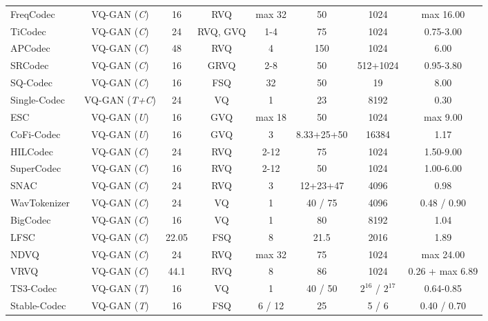 \begin{table*}[]
{\begin{tabular}{@{}lccccccc@{}}
{FreqCodec}~\cite{du2024funcodec} & VQ-GAN (\textit{C})& 16 & RVQ & max 32 & 50 & 1024 & max 16.00 \\
TiCodec~\cite{ticodec} & VQ-GAN (\textit{C})& 24 & RVQ, GVQ & 1-4 & 75 & 1024 & 0.75-3.00  \\
APCodec~\cite{APCodec} & VQ-GAN (\textit{C})& 48 & RVQ & 4 & 150 &1024 & 6.00 \\
SRCodec~\cite{zheng2024srcodec} & VQ-GAN (\textit{C}) & 16 & GRVQ   & 2-8 & 50 & 512+1024 & 0.95-3.80\\
SQ-Codec~\cite{yang24l_interspeech} & VQ-GAN (\textit{C})& 16 & FSQ & 32 & 50 &19 & 8.00 \\
Single-Codec~\cite{singlecodec} & VQ-GAN (\textit{T+C})& 24 & VQ & 1 & 23 & 8192 & 0.30  \\
ESC~\cite{gu2024esc}  & VQ-GAN (\textit{U})& 16 & GVQ & max 18 & 50 & 1024 & max 9.00 \\
CoFi-Codec~\cite{guo2024speaking} & VQ-GAN (\textit{U}) & 16 & GVQ & 3 & 8.33+25+50 & 16384 & 1.17 \\
HILCodec~\cite{ahn2024hilcodec} & VQ-GAN (\textit{C})& 24 & RVQ & 2-12 & 75 & 1024 & 1.50-9.00 \\
SuperCodec~\cite{zheng2024supercodec} & VQ-GAN (\textit{C})& 16 & RVQ & 2-12 & 50 & 1024 & 1.00-6.00\\
SNAC~\cite{Siuzdak_SNAC_Multi-Scale_Neural_2024} & VQ-GAN (\textit{C})& 24 & RVQ & 3 &12+23+47 & 4096 & 0.98 \\
WavTokenizer~\cite{ji2024wavtokenizer} & VQ-GAN (\textit{C})& 24 & VQ & 1 & 40 / 75 & 4096 & 0.48 / 0.90  \\
BigCodec~\cite{xin2024bigcodec} & VQ-GAN (\textit{C})& 16 & VQ & 1 & 80 & 8192 & 1.04 \\
LFSC~\cite{casanova2024low} & VQ-GAN (\textit{C})& 22.05 &  FSQ & 8 & 21.5 & 2016 & 1.89 \\
NDVQ~\cite{niu2024ndvq} & VQ-GAN (\textit{C})& 24 &  RVQ & max 32 & 75 & 1024 & max 24.00 \\
VRVQ~\cite{chae2024variable} & VQ-GAN (\textit{C})& 44.1 & RVQ & 8 & 86 & 1024 & {0.26 + max 6.89}\\
TS3-Codec~\cite{wu2024ts3codectransformerbasedsimplestreaming} & VQ-GAN (\textit{T})& 16 & VQ & 1 & 40 / 50 & $2^{16}$ / $2^{17}$ & 0.64-0.85 \\
Stable-Codec~\cite{parker2024scalingtransformerslowbitratehighquality} & VQ-GAN (\textit{T})& 16 & FSQ  & 6 / 12 & 25 & 5 / 6 & 0.40 / 0.70 \\

\end{tabular}}
\end{table*}
